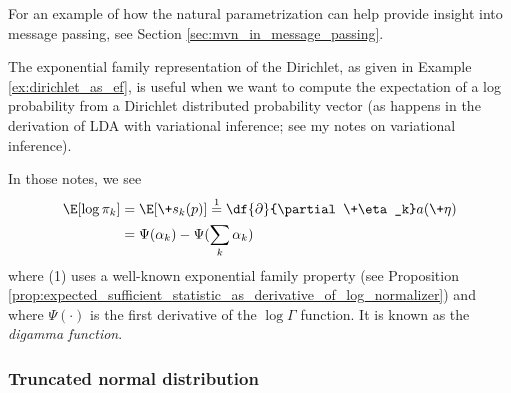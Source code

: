 \documentclass{article} %
\newcommand{\sufficientStatsFunction}{\+s}
\newcommand{\naturalParam}{\+\eta}
\begin{document}
For an example of how the natural parametrization can help provide insight into message passing,  see Section \ref{sec:mvn_in_message_passing}.

\begin{remark} The exponential family representation of the Dirichlet, as given in Example \ref{ex:dirichlet_as_ef}, is useful when we want to compute the expectation of a log probability from a Dirichlet distributed probability vector (as happens in the derivation of LDA with variational inference; see my notes on variational inference).  

In those notes,  we see
\begin{align} 
\E [ \log \pi_k] &= \E [\sufficientStatsFunction_k(p)] \stackrel{1}{=} \df{\partial}{\partial \naturalParam_k} a(\naturalParam) \nonumber \\
&=\Psi(\alpha_k) -  \Psi(\sum_k  \alpha_k) \label{eqn:expectation_of_log_probability} 
\end{align}
where (1) uses a well-known exponential family property (see Proposition \ref{prop:expected_sufficient_statistic_as_derivative_of_log_normalizer}) and where $\Psi(\cdot)$ is the first derivative of the $\log \Gamma$ function.   It is known as the \textit{digamma function}.  $ $

\end{remark}

\subsubsection{Truncated normal distribution}
\end{document}
